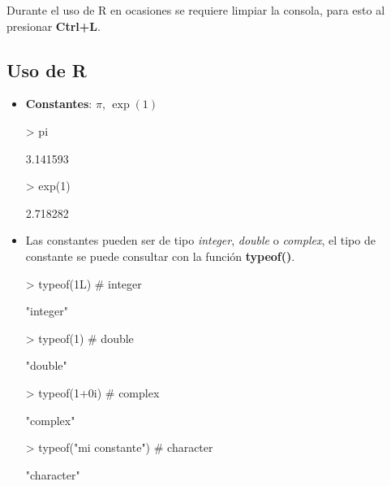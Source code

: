 \documentclass[12pt]{article}
\begin{document}
Durante el uso de R en ocasiones se requiere limpiar la consola, para esto al presionar \textbf{Ctrl+L}.  

\subsection{Uso de R}

\begin{itemize}
\item \textbf{Constantes}: $\pi$, $\exp(1)$

\begin{Schunk}
\begin{Sinput}
> pi
\end{Sinput}
\begin{Soutput}
[1] 3.141593
\end{Soutput}
\begin{Sinput}
> exp(1)
\end{Sinput}
\begin{Soutput}
[1] 2.718282
\end{Soutput}
\end{Schunk}

\item Las constantes pueden ser de tipo \textit{integer},  \textit{double} o \textit{complex}, el tipo de constante se puede consultar con la función \textbf{typeof()}.

\begin{Schunk}
\begin{Sinput}
> typeof(1L)        # integer
\end{Sinput}
\begin{Soutput}
[1] "integer"
\end{Soutput}
\begin{Sinput}
> typeof(1)         # double
\end{Sinput}
\begin{Soutput}
[1] "double"
\end{Soutput}
\begin{Sinput}
> typeof(1+0i)      # complex
\end{Sinput}
\begin{Soutput}
[1] "complex"
\end{Soutput}
\begin{Sinput}
> typeof("mi constante")  # character
\end{Sinput}
\begin{Soutput}
[1] "character"
\end{Soutput}
\end{Schunk}


\end{itemize}
\end{document}
